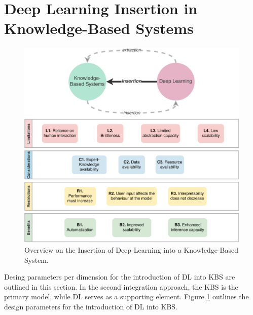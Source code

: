 \section{Deep Learning Insertion in Knowledge-Based Systems}\label{5_sec:dl_intro_kbs_methodology}
\begin{figure}[t]
    \centering
    \includegraphics[width=\linewidth]{5_dlintegrationkbs/figures/DL_intro_KBS.eps}
    \caption{Overview on the Insertion of Deep Learning into a Knowledge-Based System.}
    \label{fig:overview_dl_kbs_intro}
\end{figure}
Desing parameters per dimension for the introduction of DL into KBS are outlined in this section. In the second integration approach, the KBS is the primary model, while DL serves as a supporting element. Figure \ref{fig:overview_dl_kbs_intro} outlines the design parameters for the introduction of DL into KBS.
